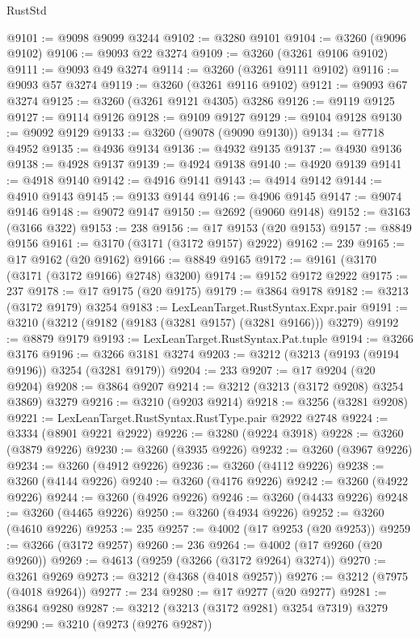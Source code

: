 \begin{lexlean}{RustStd}
\begin{coremodule}
@9101 := @9098 @9099 @3244
@9102 := @3280 @9101
@9104 := @3260 (@9096 @9102)
@9106 := @9093 @22 @3274
@9109 := @3260 (@3261 @9106 @9102)
@9111 := @9093 @49 @3274
@9114 := @3260 (@3261 @9111 @9102)
@9116 := @9093 @57 @3274
@9119 := @3260 (@3261 @9116 @9102)
@9121 := @9093 @67 @3274
@9125 := @3260 (@3261 @9121 @4305) @3286
@9126 := @9119 @9125
@9127 := @9114 @9126
@9128 := @9109 @9127
@9129 := @9104 @9128
@9130 := @9092 @9129
@9133 := @3260 (@9078 (@9090 @9130))
@9134 := @7718 @4952
@9135 := @4936 @9134
@9136 := @4932 @9135
@9137 := @4930 @9136
@9138 := @4928 @9137
@9139 := @4924 @9138
@9140 := @4920 @9139
@9141 := @4918 @9140
@9142 := @4916 @9141
@9143 := @4914 @9142
@9144 := @4910 @9143
@9145 := @9133 @9144
@9146 := @4906 @9145
@9147 := @9074 @9146
@9148 := @9072 @9147
@9150 := @2692 (@9060 @9148)
@9152 := @3163 (@3166 @322)
@9153 := 238
@9156 := @17 @9153 (@20 @9153)
@9157 := @8849 @9156
@9161 := @3170 (@3171 (@3172 @9157) @2922)
@9162 := 239
@9165 := @17 @9162 (@20 @9162)
@9166 := @8849 @9165
@9172 := @9161 (@3170 (@3171 (@3172 @9166) @2748) @3200)
@9174 := @9152 @9172 @2922
@9175 := 237
@9178 := @17 @9175 (@20 @9175)
@9179 := @3864 @9178
@9182 := @3213 (@3172 @9179) @3254
@9183 := LexLeanTarget.RustSyntax.Expr.pair
@9191 := @3210 (@3212 (@9182 (@9183 (@3281 @9157) (@3281 @9166))) @3279)
@9192 := @8879 @9179
@9193 := LexLeanTarget.RustSyntax.Pat.tuple
@9194 := @3266 @3176
@9196 := @3266 @3181 @3274
@9203 := @3212 (@3213 (@9193 (@9194 @9196)) @3254 (@3281 @9179))
@9204 := 233
@9207 := @17 @9204 (@20 @9204)
@9208 := @3864 @9207
@9214 := @3212 (@3213 (@3172 @9208) @3254 @3869) @3279
@9216 := @3210 (@9203 @9214)
@9218 := @3256 (@3281 @9208)
@9221 := LexLeanTarget.RustSyntax.RustType.pair @2922 @2748
@9224 := @3334 (@8901 @9221 @2922)
@9226 := @3280 (@9224 @3918)
@9228 := @3260 (@3879 @9226)
@9230 := @3260 (@3935 @9226)
@9232 := @3260 (@3967 @9226)
@9234 := @3260 (@4912 @9226)
@9236 := @3260 (@4112 @9226)
@9238 := @3260 (@4144 @9226)
@9240 := @3260 (@4176 @9226)
@9242 := @3260 (@4922 @9226)
@9244 := @3260 (@4926 @9226)
@9246 := @3260 (@4433 @9226)
@9248 := @3260 (@4465 @9226)
@9250 := @3260 (@4934 @9226)
@9252 := @3260 (@4610 @9226)
@9253 := 235
@9257 := @4002 (@17 @9253 (@20 @9253))
@9259 := @3266 (@3172 @9257)
@9260 := 236
@9264 := @4002 (@17 @9260 (@20 @9260))
@9269 := @4613 (@9259 (@3266 (@3172 @9264) @3274))
@9270 := @3261 @9269
@9273 := @3212 (@4368 (@4018 @9257))
@9276 := @3212 (@7975 (@4018 @9264))
@9277 := 234
@9280 := @17 @9277 (@20 @9277)
@9281 := @3864 @9280
@9287 := @3212 (@3213 (@3172 @9281) @3254 @7319) @3279
@9290 := @3210 (@9273 (@9276 @9287))

\end{coremodule}
\end{lexlean}
